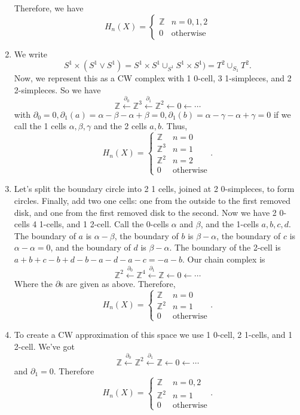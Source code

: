 \documentclass[11pt]{article}
\begin{document}
\begin{enumerate}
Therefore, we have
\[H_n(X) = \left\{ \begin{array}{ll} \mathbb{Z} & n = 0,1,2 \\ 0& \mbox{otherwise} \end{array} \right.\]
\item We write
\[S^1 \times (S^1 \vee S^1) = S^1 \times S^1 \cup_{S^1} S^1 \times S^1) = T^2 \cup_{S_1} T^2.\]
Now, we represent this as a CW complex with 1 0-cell, 3 1-simpleces, and 2 2-simpleces. So we have 
\[\mathbb{Z} \stackrel{\partial_0}{\leftarrow} \mathbb{Z}^3 \stackrel{\partial_1}{\leftarrow} \mathbb{Z}^2 \leftarrow 0 \leftarrow \cdots\]
with $\partial_0 =0 , \partial_1(a)= \alpha -\beta -\alpha + \beta=0, \partial_1(b) = \alpha- \gamma - \alpha + \gamma=0$ if we call the 1 cells $\alpha, \beta, \gamma$ and the 2 cells $a,b$. Thus,
\[H_n(X) = \left\{ \begin{array}{ll} \mathbb{Z} & n = 0\\\mathbb{Z}^3 & n=1\\ \mathbb{Z}^2 & n=2 \\ 0& \mbox{otherwise} \end{array} . \right.\]
\item Let's split the boundary circle into 2 1 cells, joined at 2 0-simpleces, to form circles. Finally, add two one cells: one from the outside to the first removed disk, and one from the first removed disk to the second. Now we have 2 0-cells 4 1-cells, and 1 2-cell. Call the 0-cells $\alpha$ and $\beta$, and the 1-cells $a,b,c,d$. The boundary of $a$ is $\alpha - \beta$, the boundary of $b$ is $\beta - \alpha$, the boundary of $c$ is $\alpha - \alpha=0$, and the boundary of $d$ is $\beta - \alpha$. The boundary of the 2-cell is $a + b + c - b+d-b -a-d-a-c = -a-b$. Our chain complex is
\[\mathbb{Z}^2 \stackrel{\partial_0}{\leftarrow} \mathbb{Z}^4 \stackrel{\partial_1}{\leftarrow} \mathbb{Z} \leftarrow 0 \leftarrow \cdots\]
Where the $\partial$s are given as above.
Therefore, 
\[H_n(X) = \left\{ \begin{array}{ll} \mathbb{Z} & n = 0\\ \mathbb{Z}^2 &n= 1\\ 0& \mbox{otherwise} \end{array}. \right.\]

\item To create a CW approximation of this space we use 1 0-cell, 2 1-cells, and 1 2-cell.
We've got 
\[\mathbb{Z} \stackrel{\partial_0}{\leftarrow} \mathbb{Z}^2 \stackrel{\partial_1}{\leftarrow} \mathbb{Z} \leftarrow 0 \leftarrow \cdots\]
and $\partial_1 = 0$. Therefore
\[H_n(X) = \left\{ \begin{array}{ll} \mathbb{Z} & n = 0,2\\ \mathbb{Z}^2 & n=1 \\ 0& \mbox{otherwise} \end{array} . \right.\]
\end{enumerate}
\end{document}
